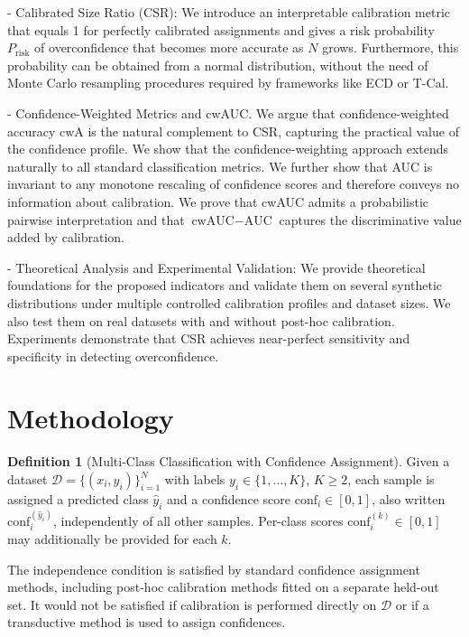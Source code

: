 \documentclass{article}
\theoremstyle{plain}
\theoremstyle{definition}
\newtheorem{definition}{Definition}
\theoremstyle{remark}
\begin{document}
- Calibrated Size Ratio (CSR): We introduce an interpretable calibration metric that equals 1 for perfectly calibrated assignments and gives a risk probability $P_{\mathrm{risk}}$ of overconfidence that becomes more accurate as $N$ grows. Furthermore, this probability can be obtained from a normal distribution, without the need of Monte Carlo resampling procedures required by frameworks like ECD or T-Cal.

- Confidence-Weighted Metrics and cwAUC. We argue that confidence-weighted accuracy $\mathrm{cwA}$ is the natural complement to CSR, capturing the practical value of the confidence profile. We show that the confidence-weighting approach extends naturally to all standard classification metrics. We further show that AUC is invariant to any monotone rescaling of confidence scores and therefore conveys no information about calibration. We prove that cwAUC admits a probabilistic pairwise interpretation and that $\text{cwAUC} - \text{AUC}$ captures the discriminative value added by calibration.

- Theoretical Analysis and Experimental Validation:  We provide theoretical foundations for the proposed indicators and validate them on several synthetic distributions under multiple controlled calibration profiles and dataset sizes. We also test them on real datasets with and without post-hoc calibration. Experiments demonstrate that CSR achieves near-perfect sensitivity and specificity in detecting overconfidence.


\section{Methodology}

\begin{definition}[Multi-Class Classification with Confidence Assignment] \label{def:conf_assignment_setup}
Given a dataset $\mathcal{D} = \{(x_i, y_i)\}_{i=1}^N$ with labels $y_i \in \{1, \ldots, K\}$, $K \geq 2$, each sample is assigned a predicted class $\hat{y}_i$ and a confidence score $\mathrm{conf}_i \in [0,1]$, also written $\mathrm{conf}_i^{(\hat{y}_i)}$, independently of all other samples. Per-class scores $\mathrm{conf}_i^{(k)} \in [0,1]$ may additionally be provided for each $k$.
\end{definition}

The independence condition is satisfied by standard confidence assignment methods, including post-hoc calibration methods fitted on a separate held-out set. It would not be satisfied if calibration is performed directly on $\mathcal{D}$ or if a transductive method is used to assign confidences.
\end{document}
